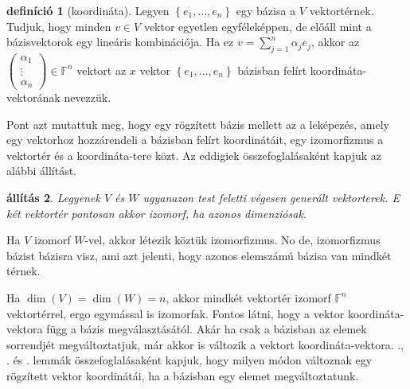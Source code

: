 \documentclass[9pt, a4paper, showtrims]{memoir}
\makeatletter
\let\Aref\relax
\renewenvironment{proof}[1][\proofname]
    {\par\pushQED{\qed}%
    \normalfont \topsep6\p@\@plus6\p@\relax
    \trivlist
    \item[\hskip\labelsep
        \itshape
    #1\@addpunct{:}]\ignorespaces}
    {\popQED\endtrivlist\@endpefalse}
\theoremstyle{plain}
\newtheorem{proposition}{állítás}[chapter]
\theoremstyle{remark}
\theoremstyle{definition}
\newtheorem{definition}[proposition]{definíció}
\makeatother
\begin{document}
\begin{definition}[koordináta]
	Legyen $\left\{ e_1,\ldots,e_n \right\}$ egy bázisa a $V$ vektortérnek.
	Tudjuk, hogy minden $v\in V$ vektor egyetlen egyféleképpen, de előáll mint a bázisvektorok egy lineáris kombinációja.
	Ha ez $v=\sum_{j=1}^n\alpha_je_j$, akkor az
	\begin{math}
		\begin{pmatrix}
			\alpha_1 \\ \vdots\\ \alpha_n
		\end{pmatrix}
		\in
		\mathbb{F}^n
	\end{math}
	vektort az $x$ vektor $\left\{ e_1,\ldots,e_n \right\}$ bázisban felírt koordináta-vektorának nevezzük.
\end{definition}
Pont azt mutattuk meg, hogy egy rögzített bázis mellett az a leképezés,
amely egy vektorhoz hozzárendeli a bázisban felírt koordinátáit, egy izomorfizmus
a vektortér és a koordináta-tere közt.
Az eddigiek összefoglalásaként kapjuk az alábbi állítást.
\begin{proposition}
	Legyenek $V$ és $W$ ugyanazon test feletti végesen generált vektorterek.
	E két vektortér pontosan akkor izomorf, ha azonos dimenziósak.
\end{proposition}
\begin{proof}
	Ha $V$ izomorf $W$-vel, akkor létezik köztük izomorfizmus.
	No de, izomorfizmus bázist bázisra visz, ami azt jelenti, hogy azonos elemszámú
	bázisa van mindkét térnek.

	Ha $\dim(V)=\dim(W)=n$, akkor mindkét vektortér izomorf $\mathbb{F}^n$ vektortérrel,
	ergo egymással is izomorfak.
\end{proof}
Fontos látni, hogy a vektor koordináta-vektora függ a bázis megválasztásától.
Akár ha csak a bázisban az elemek sorrendjét megváltoztatjuk,
már akkor is változik a vektort koordináta-vektora.
\Aref{le:gencsere}., .  és . lemmák összefoglalásaként kapjuk,
hogy milyen módon változnak egy rögzített vektor koordinátái,
ha a bázisban egy elemet megváltoztatunk.
\end{document}
